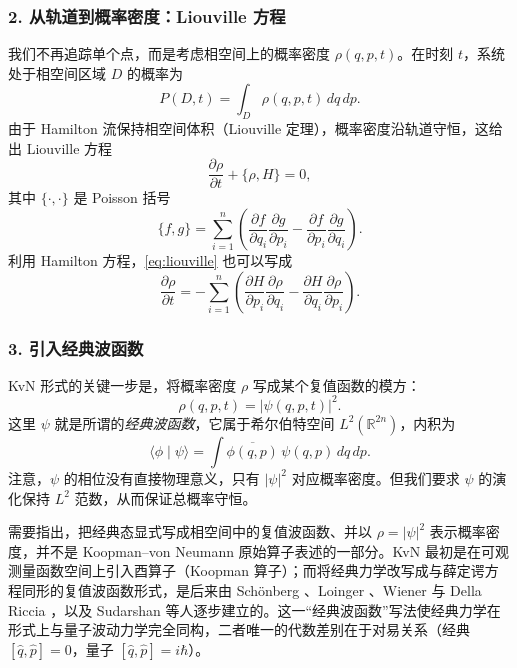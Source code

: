 ﻿\documentclass[10pt,a4paper]{article}
\numberwithin{equation}{section}
\begin{document}
\subsubsection*{2. 从轨道到概率密度：Liouville 方程}

我们不再追踪单个点，而是考虑相空间上的概率密度 $\rho(q,p,t)$。在时刻 $t$，系统处于相空间区域 $D$ 的概率为
\begin{equation}
    P(D,t) = \int_D \rho(q,p,t)\,dq\,dp .
\end{equation}
由于 Hamilton 流保持相空间体积（Liouville 定理），概率密度沿轨道守恒，这给出 Liouville 方程
\begin{equation}
    \frac{\partial \rho}{\partial t} + \{\rho,H\} = 0,
    \label{eq:liouville}
\end{equation}
其中 $\{\cdot,\cdot\}$ 是 Poisson 括号
\begin{equation}
    \{f,g\} = \sum_{i=1}^n
    \left(
        \frac{\partial f}{\partial q_i}\frac{\partial g}{\partial p_i}
        -
        \frac{\partial f}{\partial p_i}\frac{\partial g}{\partial q_i}
    \right).
\end{equation}
利用 Hamilton 方程，\eqref{eq:liouville} 也可以写成
\begin{equation}
    \frac{\partial \rho}{\partial t}
    =
    -\sum_{i=1}^n
    \left(
        \frac{\partial H}{\partial p_i}\frac{\partial \rho}{\partial q_i}
        -
        \frac{\partial H}{\partial q_i}\frac{\partial \rho}{\partial p_i}
    \right).
    \label{eq:liouville-expanded}
\end{equation}

\subsubsection*{3. 引入经典波函数}

KvN 形式的关键一步是，将概率密度 $\rho$ 写成某个复值函数的模方：
\begin{equation}
    \rho(q,p,t) = |\psi(q,p,t)|^2 .
    \label{eq:classical-wavefunction}
\end{equation}
这里 $\psi$ 就是所谓的\emph{经典波函数}，它属于希尔伯特空间 $L^2(\mathbb{R}^{2n})$，内积为
\begin{equation}
    \langle \phi \mid \psi \rangle
    =
    \int \overline{\phi(q,p)}\,\psi(q,p)\,dq\,dp .
\end{equation}
注意，$\psi$ 的相位没有直接物理意义，只有 $|\psi|^2$ 对应概率密度。但我们要求 $\psi$ 的演化保持 $L^2$ 范数，从而保证总概率守恒。

需要指出，把经典态显式写成相空间中的复值波函数、并以 $\rho=|\psi|^2$ 表示概率密度，并不是 Koopman--von Neumann 原始算子表述的一部分。KvN 最初是在可观测量函数空间上引入酉算子（Koopman 算子）；而将经典力学改写成与薛定谔方程同形的复值波函数形式，是后来由 Schönberg \cite{Schonberg1954}、Loinger \cite{Loinger1962}、Wiener 与 Della Riccia \cite{WienerDellaRiccia1966}，以及 Sudarshan \cite{Sudarshan1976} 等人逐步建立的。这一“经典波函数”写法使经典力学在形式上与量子波动力学完全同构，二者唯一的代数差别在于对易关系（经典 $[\hat q,\hat p]=0$，量子 $[\hat q,\hat p]=i\hbar$）。
\end{document}
